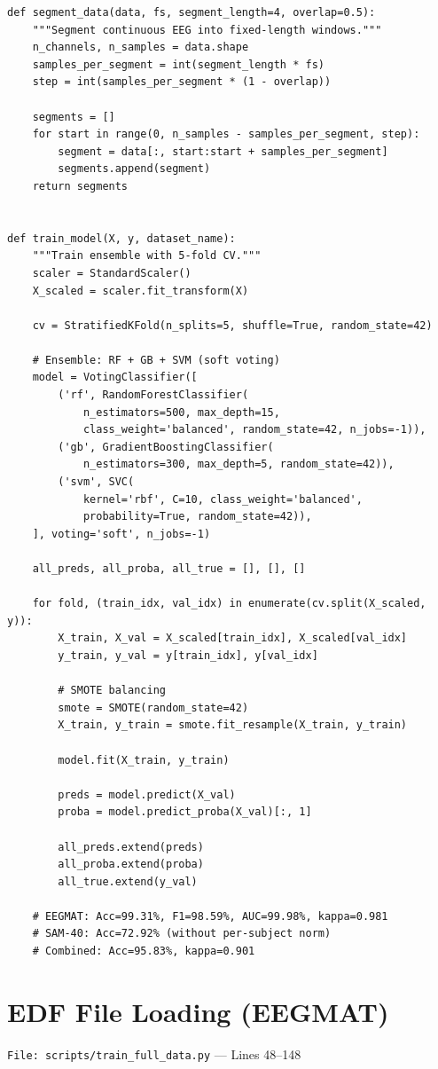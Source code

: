 \documentclass[11pt,a4paper]{article}
\begin{document}
\begin{lstlisting}[caption={Data segmentation and ensemble training achieving 99.31\% on EEGMAT}]
def segment_data(data, fs, segment_length=4, overlap=0.5):
    """Segment continuous EEG into fixed-length windows."""
    n_channels, n_samples = data.shape
    samples_per_segment = int(segment_length * fs)
    step = int(samples_per_segment * (1 - overlap))

    segments = []
    for start in range(0, n_samples - samples_per_segment, step):
        segment = data[:, start:start + samples_per_segment]
        segments.append(segment)
    return segments


def train_model(X, y, dataset_name):
    """Train ensemble with 5-fold CV."""
    scaler = StandardScaler()
    X_scaled = scaler.fit_transform(X)

    cv = StratifiedKFold(n_splits=5, shuffle=True, random_state=42)

    # Ensemble: RF + GB + SVM (soft voting)
    model = VotingClassifier([
        ('rf', RandomForestClassifier(
            n_estimators=500, max_depth=15,
            class_weight='balanced', random_state=42, n_jobs=-1)),
        ('gb', GradientBoostingClassifier(
            n_estimators=300, max_depth=5, random_state=42)),
        ('svm', SVC(
            kernel='rbf', C=10, class_weight='balanced',
            probability=True, random_state=42)),
    ], voting='soft', n_jobs=-1)

    all_preds, all_proba, all_true = [], [], []

    for fold, (train_idx, val_idx) in enumerate(cv.split(X_scaled, y)):
        X_train, X_val = X_scaled[train_idx], X_scaled[val_idx]
        y_train, y_val = y[train_idx], y[val_idx]

        # SMOTE balancing
        smote = SMOTE(random_state=42)
        X_train, y_train = smote.fit_resample(X_train, y_train)

        model.fit(X_train, y_train)

        preds = model.predict(X_val)
        proba = model.predict_proba(X_val)[:, 1]

        all_preds.extend(preds)
        all_proba.extend(proba)
        all_true.extend(y_val)

    # EEGMAT: Acc=99.31%, F1=98.59%, AUC=99.98%, kappa=0.981
    # SAM-40: Acc=72.92% (without per-subject norm)
    # Combined: Acc=95.83%, kappa=0.901
\end{lstlisting}

\section{EDF File Loading (EEGMAT)}
\texttt{File: scripts/train\_full\_data.py} --- Lines 48--148
\end{document}
